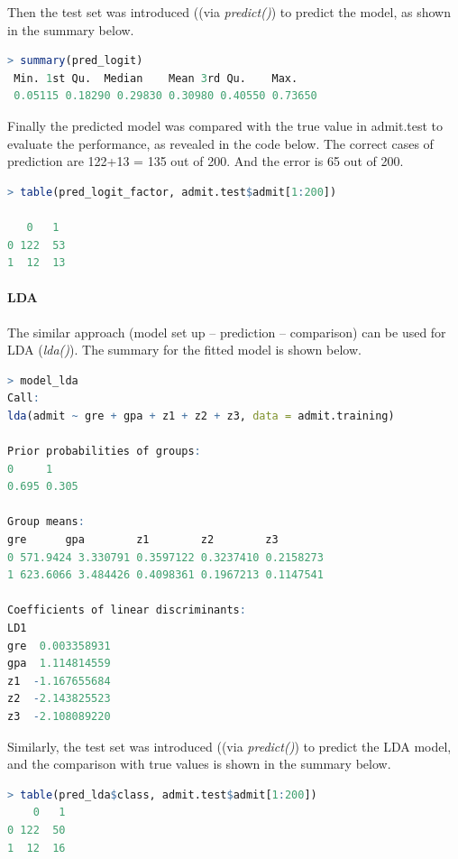 \documentclass[10pt, letterpaper]{proc}
\begin{document}
Then the test set was introduced ((via \textit{predict()}) to predict the model, as shown in the summary below.

\begin{lstlisting}[language=R, breaklines=T, basicstyle=\footnotesize\ttfamily]
 > summary(pred_logit)
 Min. 1st Qu.  Median    Mean 3rd Qu.    Max. 
 0.05115 0.18290 0.29830 0.30980 0.40550 0.73650 
\end{lstlisting}

Finally the predicted model was compared with the true value in admit.test to evaluate the performance, as revealed in the code below. The correct cases of prediction are 122+13 = 135 out of 200. And the error is 65 out of 200.

\begin{lstlisting}[language=R, breaklines=T, basicstyle=\footnotesize\ttfamily]
> table(pred_logit_factor, admit.test$admit[1:200])

   0   1
0 122  53
1  12  13
\end{lstlisting}
 
\paragraph{LDA} The similar approach (model set up -- prediction -- comparison) can be used for LDA (\textit{lda()}). The summary for the fitted model is shown below.

\begin{lstlisting}[language=R, breaklines=T, basicstyle=\footnotesize\ttfamily]
> model_lda
Call:
lda(admit ~ gre + gpa + z1 + z2 + z3, data = admit.training)

Prior probabilities of groups:
0     1 
0.695 0.305 

Group means:
gre      gpa        z1        z2        z3
0 571.9424 3.330791 0.3597122 0.3237410 0.2158273
1 623.6066 3.484426 0.4098361 0.1967213 0.1147541

Coefficients of linear discriminants:
LD1
gre  0.003358931
gpa  1.114814559
z1  -1.167655684
z2  -2.143825523
z3  -2.108089220
\end{lstlisting}
Similarly, the test set was introduced ((via \textit{predict()}) to predict the LDA  model, and the comparison with true values is shown in the summary below.

\begin{lstlisting}[language=R, breaklines=T, basicstyle=\footnotesize\ttfamily]
> table(pred_lda$class, admit.test$admit[1:200])
    0   1
0 122  50
1  12  16
\end{lstlisting}
\end{document}
